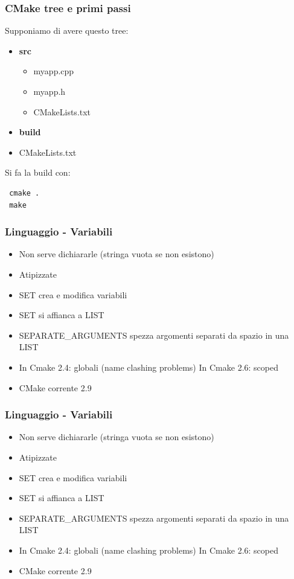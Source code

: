 \documentclass[10pt] {beamer}
\begin{document}
\begin{frame}[fragile]
\frametitle{CMake tree e primi passi}
Supponiamo di avere questo tree:

\begin{itemize}
\item<1-> \textbf{src}
\begin{itemize}
	\item myapp.cpp
	\item myapp.h
	\item CMakeLists.txt
\end{itemize}
\item<2-> \textbf{build}
\item<3-> CMakeLists.txt
\end{itemize}

Si fa la build con:
\begin{verbatim}
 cmake .
 make
\end{verbatim}
\end{frame}



\begin{frame}
	\frametitle{Linguaggio - Variabili}
	\begin{itemize}
		\item Non serve dichiararle (stringa vuota se non esistono)
		\item Atipizzate
		\item SET crea e modifica variabili
		\item SET si affianca a LIST
		\item SEPARATE\_ARGUMENTS spezza argomenti separati da spazio in una LIST
		\item In Cmake 2.4: globali (name clashing problems)  In Cmake 2.6: scoped
		\item CMake corrente 2.9
\end{itemize}
\end{frame}

\begin{frame}
	\frametitle{Linguaggio - Variabili}
	\begin{itemize}
		\item Non serve dichiararle (stringa vuota se non esistono)
		\item Atipizzate
		\item SET crea e modifica variabili
		\item SET si affianca a LIST
		\item SEPARATE\_ARGUMENTS spezza argomenti separati da spazio in una LIST
		\item In Cmake 2.4: globali (name clashing problems)  In Cmake 2.6: scoped
		\item CMake corrente 2.9
\end{itemize}
\end{frame}
\end{document}
